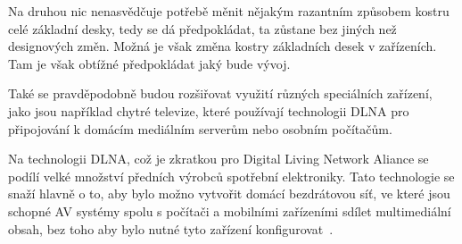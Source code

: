 Na druhou nic nenasvědčuje potřebě měnit
nějakým razantním způsobem kostru celé základní desky, tedy se dá předpokládat,
ta zůstane bez jiných než designových změn. Možná je však změna kostry základních
desek v zařízeních. Tam je však obtížné předpokládat jaký bude vývoj.

Také se pravděpodobně budou rozšiřovat využití různých speciálních zařízení, jako
jsou například chytré televize, které používají technologii DLNA pro připojování
k domácím mediálním serverům nebo osobním počítačům.

Na technologii DLNA, což je zkratkou pro Digital Living Network Aliance se podílí
velké množství předních výrobců spotřební elektroniky. Tato technologie se snaží hlavně o to, aby bylo možno vytvořit domácí bezdrátovou síť, ve které jsou schopné AV systémy
spolu s počítači a mobilními zařízeními sdílet multimediální obsah, bez toho
aby bylo nutné tyto zařízení konfigurovat~\cite{ref:mb:embedded}.
